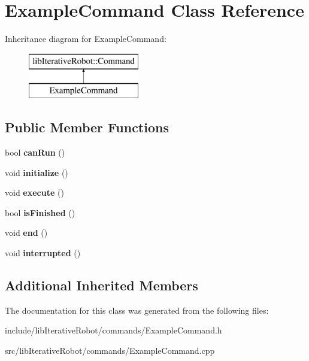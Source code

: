 \hypertarget{class_example_command}{}\section{Example\+Command Class Reference}
\label{class_example_command}
Inheritance diagram for Example\+Command\+:\begin{figure}[H]
\begin{center}
\leavevmode
\includegraphics[height=2.000000cm]{class_example_command}
\end{center}
\end{figure}
\subsection*{Public Member Functions}
\begin{DoxyCompactItemize}
\item 
\mbox{\label{class_example_command_ad1df0170d99bcef6c6bc1676551f9539}} 
bool {\bfseries can\+Run} ()
\item 
\mbox{\label{class_example_command_ae7bea17127c1697acbf90d6022eb5b5d}} 
void {\bfseries initialize} ()
\item 
\mbox{\label{class_example_command_af6fead537dd568d80aa3097ca207eda5}} 
void {\bfseries execute} ()
\item 
\mbox{\label{class_example_command_ab4e52d526bda7fe22705b2d3c44286e0}} 
bool {\bfseries is\+Finished} ()
\item 
\mbox{\label{class_example_command_ac3da078fdf1e7a7f94488db815bb0457}} 
void {\bfseries end} ()
\item 
\mbox{\label{class_example_command_ae5a4bb67aa6e6c6234c3dca8eb7ad7ec}} 
void {\bfseries interrupted} ()
\end{DoxyCompactItemize}
\subsection*{Additional Inherited Members}


The documentation for this class was generated from the following files\+:\begin{DoxyCompactItemize}
\item 
include/lib\+Iterative\+Robot/commands/Example\+Command.\+h\item 
src/lib\+Iterative\+Robot/commands/Example\+Command.\+cpp\end{DoxyCompactItemize}
